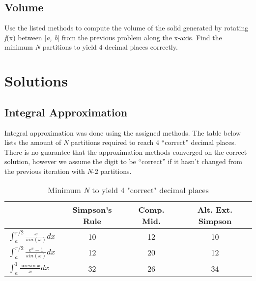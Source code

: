 \documentclass[a4paper12pt,titlepage]{article}
\begin{document}
\subsection{Volume}
Use the listed methods to compute the volume of the solid generated by rotating \textit{f}(x)  between [\textit{a, b}] from the previous problem along the x-axis.  Find the minimum \textit{N} partitions to yield 4 decimal places correctly.

\clearpage

\section{Solutions}
    \subsection{Integral Approximation}
        Integral approximation was done using the assigned methods. The table below lists the amount of \textit{N} partitions required to reach 4 “correct” decimal places. There is no guarantee that the approximation methods converged on the correct solution, however we assume the digit to be “correct” if it hasn’t changed from the previous iteration with \textit{N}-2 partitions.
        
        \begin{table}[h!]
          \begin{center}
            \caption{Minimum \textit{N} to yield 4 "correct" decimal places}
            \label{tab:table1}
            \begin{tabular}{|l|c|c|c|}
              \toprule
              \textbf{} & \textbf{Simpson's Rule} & \textbf{Comp. Mid.} & \textbf{Alt. Ext. Simpson}\\
              \hline
              $\int_{a}^{\pi /2} \frac{x}{sin(x)} dx$ & 10 & 12 & 10\\
              \hline
              $\int_{a}^{\pi /2} \frac{e^{x} - 1}{sin(x)} dx$ & 12 & 20 & 12\\
              \hline
              $\int_{a}^{1} \frac{\arcsin{x}}{x} dx$ & 32 & 26 & 34\\
              \hline
            \end{tabular}
          \end{center}
        \end{table}
\end{document}
